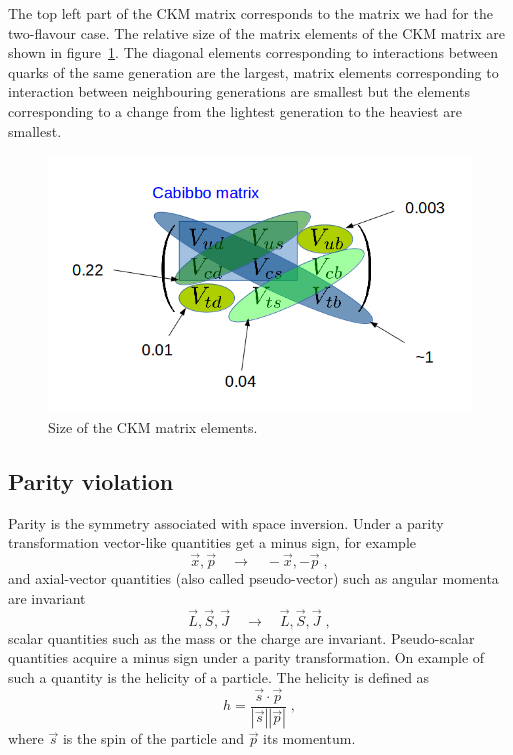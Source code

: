 \documentclass[12pt]{article}
\begin{document}
The top left part of the CKM matrix corresponds to the matrix we had for the two-flavour case. The relative size of the matrix elements of the CKM matrix are shown in figure~\ref{fig:CKMsize}. The diagonal elements corresponding to interactions between quarks of the same generation are the largest, matrix elements corresponding to interaction between neighbouring generations are smallest but the elements corresponding to a change from the lightest generation to the heaviest are smallest. 
\begin{figure}
\begin{center}
\includegraphics[scale=0.4]{images/CKMsize.png}
\end{center}
\caption{Size of the CKM matrix elements.}\label{fig:CKMsize}
\end{figure}

\clearpage
\subsection{Parity violation}
Parity is the symmetry associated with space inversion. Under a parity transformation vector-like quantities get a minus sign, for example
\[\vec x,\vec p\quad \longrightarrow \quad -\vec x,-\vec p \;,\]
and axial-vector quantities (also called pseudo-vector) such as angular momenta are invariant
\[\vec L,\vec S,\vec J \quad\longrightarrow\quad \vec L,\vec S,\vec J\;,\]
scalar quantities such as the mass or the charge are invariant. Pseudo-scalar quantities acquire a minus sign under a parity transformation. On example of such a quantity is the helicity of a particle. The helicity is defined as
\[h=\frac{\vec s\cdot \vec p}{|\vec s||\vec p|}\;,\] 
where $\vec s$ is the spin of the particle and $\vec p$ its momentum. 
\end{document}
